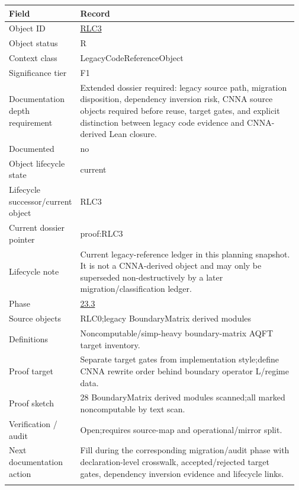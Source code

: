 \begin{longtable}{L{0.16\linewidth} L{0.81\linewidth}}
\hline
\textbf{Field} & \textbf{Record}\\
\hline
Object ID & \hyperlink{object-row-RLC3}{RLC3}\\
\hline\addlinespace[0.20em]
Object status & R\\
\hline\addlinespace[0.20em]
Context class & LegacyCodeReferenceObject\\
\hline\addlinespace[0.20em]
Significance tier & F1\\
\hline\addlinespace[0.20em]
Documentation depth requirement & Extended dossier required: legacy source path, migration disposition, dependency inversion risk, CNNA source objects required before reuse, target gates, and explicit distinction between legacy code evidence and CNNA-derived Lean closure.\\
\hline\addlinespace[0.20em]
Documented & no\\
\hline\addlinespace[0.20em]
Object lifecycle state & current\\
\hline\addlinespace[0.20em]
Lifecycle successor/\allowbreak{}current object & RLC3\\
\hline\addlinespace[0.20em]
Current dossier pointer & proof:RLC3\\
\hline\addlinespace[0.20em]
Lifecycle note & Current legacy-reference ledger in this planning snapshot. It is not a CNNA-derived object and may only be superseded non-destructively by a later migration/\allowbreak{}classification ledger.\\
\hline\addlinespace[0.20em]
Phase & \hyperlink{phase-row-23-3}{23.3}\\
\hline\addlinespace[0.20em]
Source objects & RLC0;\newline legacy BoundaryMatrix derived modules\\
\hline\addlinespace[0.20em]
Definitions & Noncomputable/\allowbreak{}simp-heavy boundary-matrix AQFT target inventory.\\
\hline\addlinespace[0.20em]
Proof target & Separate target gates from implementation style;\newline define CNNA rewrite order behind boundary operator L/\allowbreak{}regime data.\\
\hline\addlinespace[0.20em]
Proof sketch & 28 BoundaryMatrix derived modules scanned;\newline all marked noncomputable by text scan.\\
\hline\addlinespace[0.20em]
Verification /\allowbreak{} audit & Open;\newline requires source-map and operational/\allowbreak{}mirror split.\\
\hline\addlinespace[0.20em]
Next documentation action & Fill during the corresponding migration/\allowbreak{}audit phase with declaration-level crosswalk, accepted/\allowbreak{}rejected target gates, dependency inversion evidence and lifecycle links.\\
\hline\addlinespace[0.20em]
\end{longtable}
